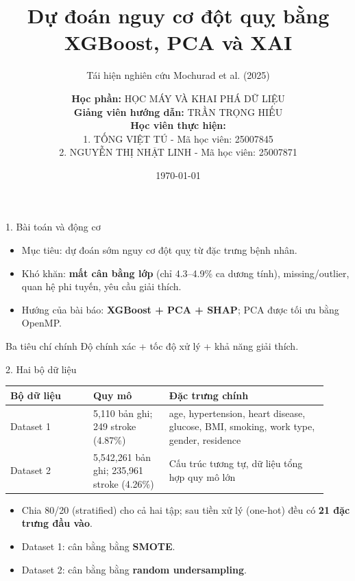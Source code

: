 \documentclass[aspectratio=169,11pt]{beamer}
\title{Dự đoán nguy cơ đột quỵ bằng XGBoost, PCA và XAI}
\subtitle{Tái hiện nghiên cứu Mochurad et al. (2025)}
\author[Nhóm thực hiện]{
	\small
	\textbf{Học phần:} HỌC MÁY VÀ KHAI PHÁ DỮ LIỆU \\[0.2cm]
	\textbf{Giảng viên hướng dẫn:} TRẦN TRỌNG HIẾU \\[0.8cm]
	\textbf{Học viên thực hiện:} \\[0.2cm]
	1. TỐNG VIỆT TÚ - Mã học viên: 25007845 \\[0.15cm]
	2. NGUYỄN THỊ NHẬT LINH - Mã học viên: 25007871
}
\date{\today}
\begin{document}
\begin{frame}
  \titlepage
\end{frame}

\begin{frame}{1. Bài toán và động cơ}
\begin{itemize}
  \item Mục tiêu: dự đoán sớm nguy cơ đột quỵ từ đặc trưng bệnh nhân.
  \item Khó khăn: \textbf{mất cân bằng lớp} (chỉ 4.3--4.9\% ca dương tính), missing/outlier, quan hệ phi tuyến, yêu cầu giải thích.
  \item Hướng của bài báo: \textbf{XGBoost + PCA + SHAP}; PCA được tối ưu bằng OpenMP.
\end{itemize}
\begin{block}{Ba tiêu chí chính}
Độ chính xác \quad + \quad tốc độ xử lý \quad + \quad khả năng giải thích.
\end{block}
\end{frame}

\begin{frame}{2. Hai bộ dữ liệu}
\small
\begin{tabular}{p{0.24\linewidth}p{0.22\linewidth}p{0.46\linewidth}}
\toprule
\textbf{Bộ dữ liệu} & \textbf{Quy mô} & \textbf{Đặc trưng chính}\\\midrule
Dataset 1 & 5,110 bản ghi; 249 stroke (4.87\%) & age, hypertension, heart disease, glucose, BMI, smoking, work type, gender, residence\\
Dataset 2 & 5,542,261 bản ghi; 235,961 stroke (4.26\%) & Cấu trúc tương tự, dữ liệu tổng hợp quy mô lớn\\
\bottomrule
\end{tabular}
\vspace{0.5em}
\begin{itemize}
  \item Chia 80/20 (stratified) cho cả hai tập; sau tiền xử lý (one-hot) đều có \textbf{21 đặc trưng đầu vào}.
  \item Dataset 1: cân bằng bằng \textbf{SMOTE}.
  \item Dataset 2: cân bằng bằng \textbf{random undersampling}.
\end{itemize}
\end{frame}
\end{document}

